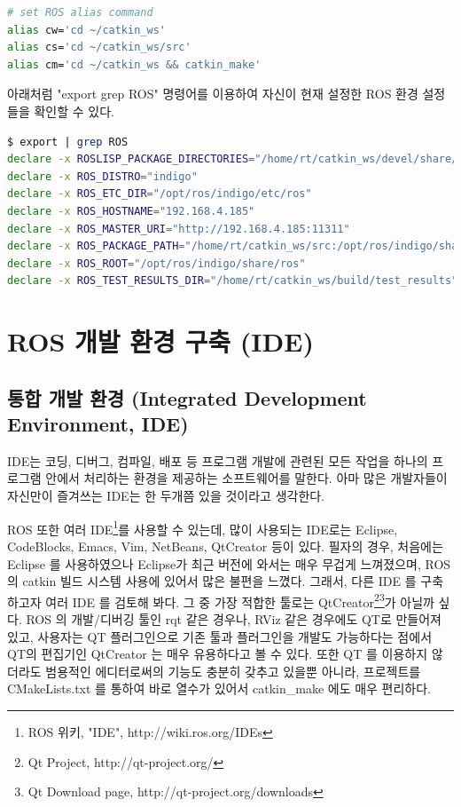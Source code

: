\begin{lstlisting}[language=bash]
# set ROS alias command
alias cw='cd ~/catkin_ws'
alias cs='cd ~/catkin_ws/src'
alias cm='cd ~/catkin_ws && catkin_make'
\end{lstlisting}

\begin{exercise}[ROS 환경 설정 확인 방법]
아래처럼 "export \textbar grep ROS" 명령어를 이용하여 자신이 현재 설정한 ROS 환경 설정들을 확인할 수 있다.

\begin{lstlisting}[language=bash, backgroundcolor=\color{ocre!10}, numbers=none]
$ export | grep ROS
declare -x ROSLISP_PACKAGE_DIRECTORIES="/home/rt/catkin_ws/devel/share/common-lisp"
declare -x ROS_DISTRO="indigo"
declare -x ROS_ETC_DIR="/opt/ros/indigo/etc/ros"
declare -x ROS_HOSTNAME="192.168.4.185"
declare -x ROS_MASTER_URI="http://192.168.4.185:11311"
declare -x ROS_PACKAGE_PATH="/home/rt/catkin_ws/src:/opt/ros/indigo/share:/opt/ros/indigo/stacks"
declare -x ROS_ROOT="/opt/ros/indigo/share/ros"
declare -x ROS_TEST_RESULTS_DIR="/home/rt/catkin_ws/build/test_results"
\end{lstlisting}
\end{exercise}

\section{ROS 개발 환경 구축 (IDE)}

\subsection{통합 개발 환경 (Integrated Development Environment, IDE)}

IDE는 코딩, 디버그, 컴파일, 배포 등 프로그램 개발에 관련된 모든 작업을 하나의 프로그램 안에서 처리하는 환경을 제공하는 소프트웨어를 말한다. 아마 많은 개발자들이 자신만이 즐겨쓰는 IDE는 한 두개쯤 있을 것이라고 생각한다. 

ROS 또한 여러 IDE\footnote{ROS 위키, "IDE", http://wiki.ros.org/IDEs}를 사용할 수 있는데, 많이 사용되는 IDE로는 Eclipse, CodeBlocks, Emacs, Vim, NetBeans, QtCreator 등이 있다. 필자의 경우, 처음에는 Eclipse 를 사용하였으나 Eclipse가 최근 버전에 와서는 매우 무겁게 느껴졌으며, ROS의 catkin 빌드 시스템 사용에 있어서 많은 불편을 느꼈다. 그래서, 다른 IDE 를 구축하고자 여러 IDE 를 검토해 봐다. 그 중 가장 적합한 툴로는 QtCreator\footnote{Qt Project, http://qt-project.org/}\footnote{Qt Download page, http://qt-project.org/downloads}가 아닐까 싶다. ROS 의 개발/디버깅 툴인 rqt 같은 경우나, RViz 같은 경우에도 QT로 만들어져 있고, 사용자는 QT 플러그인으로 기존 툴과 플러그인을 개발도 가능하다는 점에서 QT의 편집기인 QtCreator 는 매우 유용하다고 볼 수 있다. 또한 QT 를 이용하지 않더라도 범용적인 에디터로써의 기능도 충분히 갖추고 있을뿐 아니라, 프로젝트를 CMakeLists.txt 를 통하여 바로 열수가 있어서 catkin\_make 에도 매우 편리하다.

